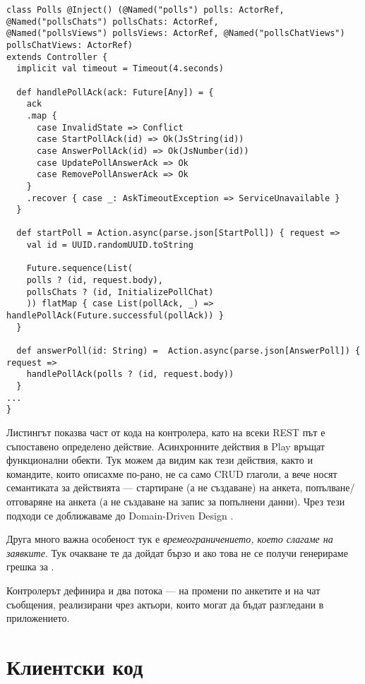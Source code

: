 \begin{lstlisting}
class Polls @Inject() (@Named("polls") polls: ActorRef, @Named("pollsChats") pollsChats: ActorRef,
@Named("pollsViews") pollsViews: ActorRef, @Named("pollsChatViews") pollsChatViews: ActorRef)
extends Controller {
  implicit val timeout = Timeout(4.seconds)
  
  def handlePollAck(ack: Future[Any]) = {
    ack
    .map {
      case InvalidState => Conflict
      case StartPollAck(id) => Ok(JsString(id))
      case AnswerPollAck(id) => Ok(JsNumber(id))
      case UpdatePollAnswerAck => Ok
      case RemovePollAnswerAck => Ok
    }
    .recover { case _: AskTimeoutException => ServiceUnavailable }
  }
  
  def startPoll = Action.async(parse.json[StartPoll]) { request =>
    val id = UUID.randomUUID.toString
    
    Future.sequence(List(
    polls ? (id, request.body),
    pollsChats ? (id, InitializePollChat)
    )) flatMap { case List(pollAck, _) => handlePollAck(Future.successful(pollAck)) }
  }
  
  def answerPoll(id: String) =  Action.async(parse.json[AnswerPoll]) { request =>
    handlePollAck(polls ? (id, request.body))
  }
...
}
\end{lstlisting}

Листингът показва част от кода на  контролера, като на всеки REST път е съпоставено определено действие. Асинхронните действия в Play връщат функционални  обекти. Тук можем да видим как тези действия, както и командите, които описахме по-рано, не са само CRUD глаголи, а вече носят семантиката за действията — стартиране (а не създаване) на анкета, попълване/отговаряне на анкета (а не създаване на запис за попълнени данни). Чрез тези подходи се доближаваме до Domain-Driven Design \cite{evans2003DDD}.

Друга много важна особеност тук е \emph{времеограничението, което слагаме на заявките}. Тук очакване те да дойдат бързо и ако това не се получи генерираме грешка за .

Контролерът дефинира и два потока — на промени по анкетите и на чат съобщения, реализирани чрез актьори, които могат да бъдат разгледани в приложението.

\section{Клиентски код}

